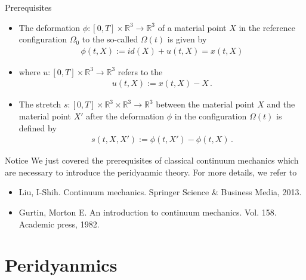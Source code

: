 \documentclass[12pt,t]{beamer}
\newcommand{\R}{\mathbb{R}}
\begin{document}
\begin{frame}{}
\begin{block}{Prerequisites}
\begin{itemize}
\item  The deformation $\phi:[0,T]\times\R^3\rightarrow\R^3$ of a material point $X$ in the reference configuration $\Omega_0$ to the so-called  $\Omega(t)$ is given by
\begin{align*}
\phi(t,X) := id(X) + u(t,X) = x(t,X)
\end{align*}
\item where $u:[0,T]\times\R^3\rightarrow\R^3$ refers to the 
\begin{align*}
u(t,X):= x(t,X) - X\,\text{.}
\end{align*}
\item The stretch $s:[0,T]\times\R^3\times\R^3\rightarrow\R^3$ between the material point $X$ and the material point $X'$ after the deformation $\phi$ in the configuration $\Omega(t)$ is defined by
\begin{align*}
s(t,X,X') := \phi(t,X') - \phi(t,X) \,\text{.}
\end{align*}
\end{itemize}

\end{block}

\end{frame}

\begin{frame}{Notice}
We just covered the prerequisites of classical continuum mechanics which are necessary to introduce the peridyanmic theory. For more details, we refer to \\
\begin{itemize}
\item Liu, I-Shih. Continuum mechanics. Springer Science \& Business Media, 2013. 
\item Gurtin, Morton E. An introduction to continuum mechanics. Vol. 158. Academic press, 1982.
\end{itemize}
\end{frame}

\section{Peridyanmics}
\end{document}

